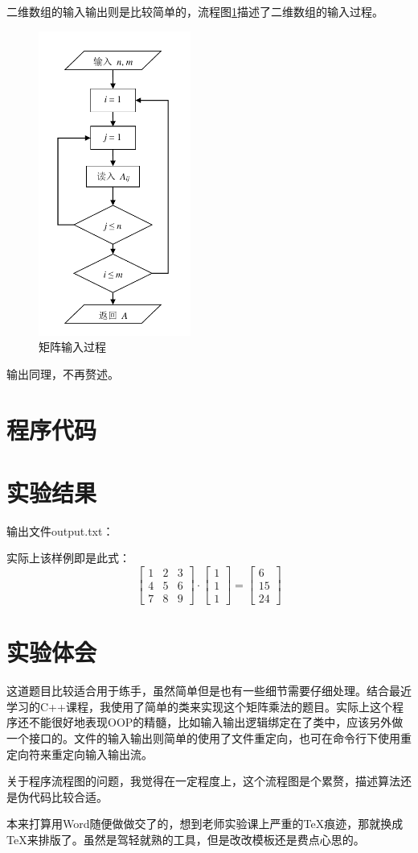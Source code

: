 \documentclass[cs4size,a4paper,nofonts]{ctexart}
\begin{document}
二维数组的输入输出则是比较简单的，流程图\ref{f1}描述了二维数组的输入过程。
\begin{figure}[htp]
\centering
\includegraphics[height=10cm]{alys01/f1.pdf}
\caption{\label{f1}矩阵输入过程}
\end{figure}

输出同理，不再赘述。

\section{程序代码}
{\linespread{1}}

\section{实验结果}
输出文件output.txt：
\begin{quote}

\end{quote}

实际上该样例即是此式：
\[
\left[\begin{array}{ccc}
1 & 2 & 3\\
4 & 5 & 6\\
7 & 8 & 9
\end{array}\right]
\cdot
\left[\begin{array}{c}
1\\
1\\
1
\end{array}\right]
=
\left[\begin{array}{c}
   6\\
  15\\
  24
\end{array}\right]
\]

\section{实验体会}
这道题目比较适合用于练手，虽然简单但是也有一些细节需要仔细处理。结合最近学习的C++课程，我使用了简单的类来实现这个矩阵乘法的题目。实际上这个程序还不能很好地表现OOP的精髓，比如输入输出逻辑绑定在了类中，应该另外做一个接口的。文件的输入输出则简单的使用了文件重定向，也可在命令行下使用重定向符来重定向输入输出流。

关于程序流程图的问题，我觉得在一定程度上，这个流程图是个累赘，描述算法还是伪代码比较合适。

本来打算用Word随便做做交了的，想到老师实验课上严重的\TeX 痕迹，那就换成\TeX 来排版了。虽然是驾轻就熟的工具，但是改改模板还是费点心思的。
\end{document}
